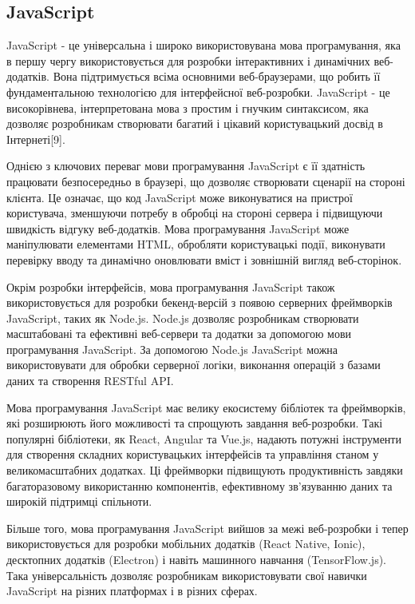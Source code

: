 \subsection{JavaScript}
\label{subsec:js-subsection}

JavaScript - це універсальна і широко використовувана мова програмування, яка в першу чергу використовується для розробки інтерактивних і динамічних веб-додатків. Вона підтримується всіма основними веб-браузерами, що робить її фундаментальною технологією для інтерфейсної веб-розробки. JavaScript - це високорівнева, інтерпретована мова з простим і гнучким синтаксисом, яка дозволяє розробникам створювати багатий і цікавий користувацький досвід в Інтернеті[9].

Однією з ключових переваг мови програмування JavaScript є її здатність працювати безпосередньо в браузері, що дозволяє створювати сценарії на стороні клієнта. Це означає, що код JavaScript може виконуватися на пристрої користувача, зменшуючи потребу в обробці на стороні сервера і підвищуючи швидкість відгуку веб-додатків. Мова програмування JavaScript може маніпулювати елементами HTML, обробляти користувацькі події, виконувати перевірку вводу та динамічно оновлювати вміст і зовнішній вигляд веб-сторінок.

Окрім розробки інтерфейсів, мова програмування JavaScript також використовується для розробки бекенд-версій з появою серверних фреймворків JavaScript, таких як Node.js. Node.js дозволяє розробникам створювати масштабовані та ефективні веб-сервери та додатки за допомогою мови програмування JavaScript. За допомогою Node.js JavaScript можна використовувати для обробки серверної логіки, виконання операцій з базами даних та створення RESTful API.

Мова програмування JavaScript має велику екосистему бібліотек та фреймворків, які розширюють його можливості та спрощують завдання веб-розробки. Такі популярні бібліотеки, як React, Angular та Vue.js, надають потужні інструменти для створення складних користувацьких інтерфейсів та управління станом у великомасштабних додатках. Ці фреймворки підвищують продуктивність завдяки багаторазовому використанню компонентів, ефективному зв'язуванню даних та широкій підтримці спільноти.

Більше того, мова програмування JavaScript вийшов за межі веб-розробки і тепер використовується для розробки мобільних додатків (React Native, Ionic), десктопних додатків (Electron) і навіть машинного навчання (TensorFlow.js). Така універсальність дозволяє розробникам використовувати свої навички JavaScript на різних платформах і в різних сферах.

